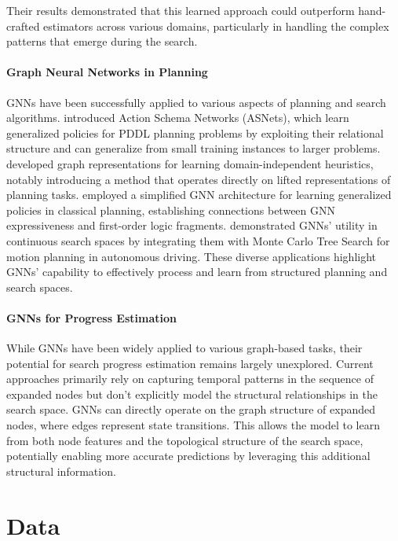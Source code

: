 \documentclass[letterpaper]{article}
\begin{document}
Their results demonstrated that this learned approach could outperform hand-crafted estimators across various domains, particularly in handling the complex patterns that emerge during the search.

\paragraph{Graph Neural Networks in Planning} GNNs have been successfully applied to various aspects of planning and search algorithms. \citet{toyer2020asnets} introduced Action Schema Networks (ASNets), which learn generalized policies for PDDL planning problems by exploiting their relational structure and can generalize from small training instances to larger problems. \citet{chen2024learning} developed graph representations for learning domain-independent heuristics, notably introducing a method that operates directly on lifted representations of planning tasks. \citet{staahlberg2022learning} employed a simplified GNN architecture for learning generalized policies in classical planning, establishing connections between GNN expressiveness and first-order logic fragments. \citet{9636442} demonstrated GNNs' utility in continuous search spaces by integrating them with Monte Carlo Tree Search for motion planning in autonomous driving. These diverse applications highlight GNNs' capability to effectively process and learn from structured planning and search spaces.

\paragraph{GNNs for Progress Estimation} While GNNs have been widely applied to various graph-based tasks, their potential for search progress estimation remains largely unexplored. Current approaches primarily rely on capturing temporal patterns in the sequence of expanded nodes but don't explicitly model the structural relationships in the search space. GNNs can directly operate on the graph structure of expanded nodes, where edges represent state transitions. This allows the model to learn from both node features and the topological structure of the search space, potentially enabling more accurate predictions by leveraging this additional structural information.

\section{Data}
\end{document}
